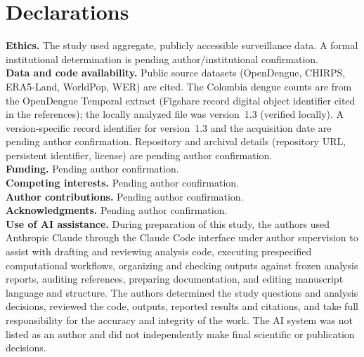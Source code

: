 \documentclass[11pt,a4paper]{article}
\begin{document}
\section*{Declarations}
\textbf{Ethics.} The study used aggregate, publicly accessible surveillance data. A formal institutional determination is pending author/institutional confirmation.\\
\textbf{Data and code availability.} Public source datasets (OpenDengue, CHIRPS, ERA5-Land, WorldPop, WER) are cited. The Colombia dengue counts are from the OpenDengue Temporal extract (Figshare record digital object identifier cited in the references); the locally analyzed file was version~1.3 (verified locally). A version-specific record identifier for version~1.3 and the acquisition date are pending author confirmation. Repository and archival details (repository URL, persistent identifier, license) are pending author confirmation.\\
\textbf{Funding.} Pending author confirmation.\\
\textbf{Competing interests.} Pending author confirmation.\\
\textbf{Author contributions.} Pending author confirmation.\\
\textbf{Acknowledgments.} Pending author confirmation.\\
\textbf{Use of AI assistance.} During preparation of this study, the authors used Anthropic Claude through the Claude Code interface under author supervision to assist with drafting and reviewing analysis code, executing prespecified computational workflows, organizing and checking outputs against frozen analysis reports, auditing references, preparing documentation, and editing manuscript language and structure. The authors determined the study questions and analysis decisions, reviewed the code, outputs, reported results and citations, and take full responsibility for the accuracy and integrity of the work. The AI system was not listed as an author and did not independently make final scientific or publication decisions.
\end{document}
